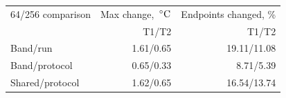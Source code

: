 \begin{tabularx}{\linewidth}{@{}Xrr@{}}
\toprule
64/256 comparison & Max change, $\,^\circ\mathrm{C}$ & Endpoints changed, \%\\
 & T1/T2 & T1/T2\\
\midrule
Band/run & 1.61/0.65 & 19.11/11.08\\
Band/protocol & 0.65/0.33 & 8.71/5.39\\
Shared/protocol & 1.62/0.65 & 16.54/13.74\\
\bottomrule
\end{tabularx}

